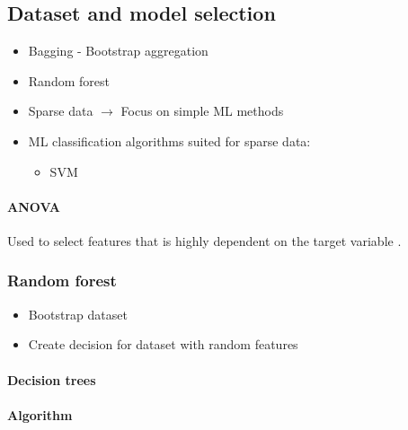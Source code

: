 \subsection{Dataset and model selection}
\begin{itemize}
    \item Bagging - Bootstrap aggregation
    \item Random forest
\end{itemize}

\begin{itemize}
    \item Sparse data $ \rightarrow $ Focus on simple ML methods
    \item ML classification algorithms suited for sparse data: 
        \begin{itemize}
            \item SVM
        \end{itemize}
        
\end{itemize}



\paragraph{ANOVA} 
Used to select features that is highly dependent on the target variable
\cite{anova}. 



\subsubsection{Random forest}
\begin{itemize}
    \item Bootstrap dataset
    \item Create decision for dataset with random features 
\end{itemize}

\paragraph{Decision trees} 







\paragraph{Algorithm} 

